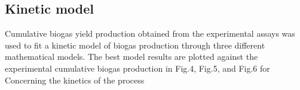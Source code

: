 \subsection{Kinetic model}
Cumulative biogas yield production obtained from the experimental assays was used to fit a kinetic model of biogas production through three different mathematical models. The best model results are plotted against the experimental cumulative biogas production in Fig.4, Fig.5, and Fig.6 for
Concerning the kinetics of the process